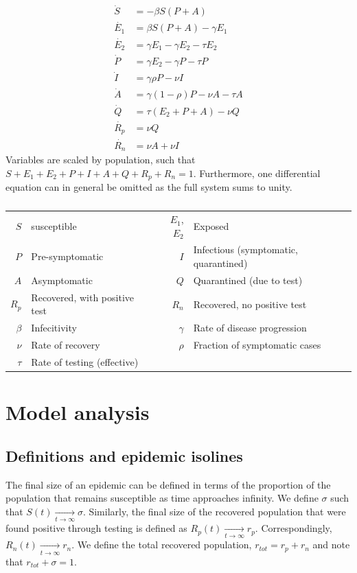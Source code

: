 \documentclass[10pt,a4paper]{article}
\begin{document}
\begin{align}
    \dot{S} &= - \beta S (P+A) \\ \label{eq:modeldefinition}
    \dot{E_1} &= \beta S (P+A) - \gamma E_1 \\
    \dot{E_2} &= \gamma E_1 - \gamma E_2 - \tau E_2\\
    \dot{P} &= \gamma E_2 - \gamma P - \tau P\\
    \dot{I} &= \gamma \rho P - \nu I \\
    \dot{A} &= \gamma (1-\rho) P - \nu A -\tau A \\
    \dot{Q} &= \tau (E_2 + P + A) - \nu Q \\
    \dot{R_p} &= \nu Q \\
    \dot{R_n} &= \nu A + \nu I
\end{align}
Variables are scaled by population, such that $S+E_1+E_2+P+I+A+Q+R_p+R_n = 1$. 
Furthermore, one differential equation can in general be omitted as the full system sums to unity.

\begin{table}[h!] \centering
    \label{tab:modeldesc}\caption{}
\begin{tabular}{|r|l||r|l|}
    \hline 
    $S$ & susceptible & $E_1$, $E_2$ & Exposed \\
    $P$ & Pre-symptomatic & $I$ & Infectious (symptomatic, quarantined) \\
    $A$ & Asymptomatic & $Q$ & Quarantined (due to test) \\
    $R_p$ & Recovered, with positive test & $R_n$ & Recovered, no positive test \\
    \hline \hline 
    $\beta$ & Infecitivity & $\gamma $ & Rate of disease progression \\
    $\nu $ & Rate of recovery & $\rho $ & Fraction of symptomatic cases \\
    $ \tau $ & Rate of testing (effective) && \\
    \hline 
\end{tabular}
\end{table}


\section{Model analysis}
\subsection{Definitions and epidemic isolines}
The final size of an epidemic can be defined in terms of the proportion of the population that remains susceptible as time approaches infinity. 
We define $\sigma$ such that $S(t) \underset{t\rightarrow \infty}{\rightarrow} \sigma$. 
Similarly, the final size of the recovered population that were found positive through testing is defined as $R_p(t) \underset{t\rightarrow \infty}{\rightarrow} r_p$. 
Correspondingly, $R_n(t) \underset{t\rightarrow \infty}{\rightarrow} r_n$.  
We define the total recovered population, $r_{tot} = r_p + r_n$ and note that $r_{tot} + \sigma = 1$.
\end{document}
